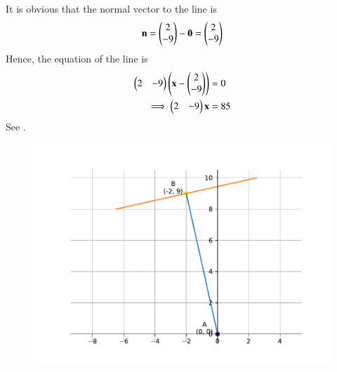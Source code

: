 It is obvious that the normal vector to the line is 
\begin{align}
\mathbf{n} =\begin{pmatrix}2 \\ -9\end{pmatrix} -\mathbf{0} 
=\begin{pmatrix}2 \\ -9\end{pmatrix}
\end{align}
Hence, the equation of the line is 
\begin{align}
	\begin{pmatrix}2 & -9\end{pmatrix}\left(\mathbf{x} - \begin{pmatrix}2 \\ -9\end{pmatrix}\right)&= 0
	\\
	\implies 
	\begin{pmatrix}2 & -9\end{pmatrix}\mathbf{x} &= 85
\end{align}
See 
		.
	\begin{figure}[H]
		\centering
 \includegraphics[width=0.75\columnwidth]{chapters/11/10/2/15/figs/fig.pdf}
		\caption{}
		\label{fig:11/10/2/15}
  	\end{figure}
